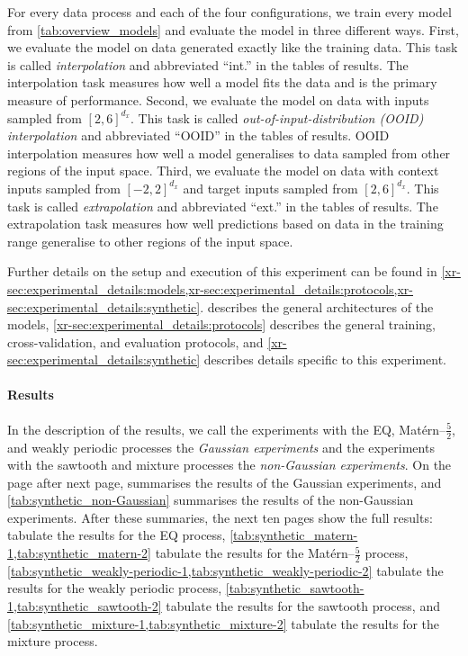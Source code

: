 \documentclass[12pt, twoside]{report}
\newcommand{\xrprefix}[1]{xr-#1}
\begin{document}
For every data process and each of the four configurations, we train every model from \cref{tab:overview_models} and evaluate the model in three different ways.
First, we evaluate the model on data generated exactly like the training data.
This task is called \emph{interpolation} and abbreviated ``int.'' in the tables of results.
The interpolation task measures how well a model fits the data
and is the primary measure of performance.
Second, we evaluate the model on data with inputs sampled from $[2, 6]^{d_x}$.
This task is called \emph{out-of-input-distribution (OOID) interpolation} and abbreviated ``OOID'' in the tables of results.
OOID interpolation measures how well a model generalises to data sampled from other regions of the input space.
Third, we evaluate the model on data with context inputs sampled from $[-2, 2]^{d_x}$ and target inputs sampled from $[2, 6]^{d_x}$.
This task is called \emph{extrapolation} and abbreviated ``ext.'' in the tables of results.
The extrapolation task measures how well predictions based on data in the training range generalise to other regions of the input space.

Further details on the setup and execution of this experiment can be found in
\cref{\xrprefix{sec:experimental_details:models},\xrprefix{sec:experimental_details:protocols},\xrprefix{sec:experimental_details:synthetic}}.
\Cref{\xrprefix{sec:experimental_details:models}} describes the general architectures of the models, \cref{\xrprefix{sec:experimental_details:protocols}} describes the general training, cross-validation, and evaluation protocols, and \cref{\xrprefix{sec:experimental_details:synthetic}} describes details specific to this experiment.

\paragraph{Results}
In the description of the results, we call the experiments with the EQ, Mat\'ern--$\frac52$, and weakly periodic processes the \emph{Gaussian experiments} and the experiments with the sawtooth and mixture processes the \emph{non-Gaussian experiments}.
On the page after next page,
 summarises the results of the Gaussian experiments, and \cref{tab:synthetic_non-Gaussian} summarises the results of the non-Gaussian experiments.
After these summaries, the next ten pages show the full results:
 tabulate the results for the EQ process,
\cref{tab:synthetic_matern-1,tab:synthetic_matern-2} tabulate the results for the Mat\'ern--$\frac52$ process,
\cref{tab:synthetic_weakly-periodic-1,tab:synthetic_weakly-periodic-2} tabulate the results for the weakly periodic process,
\cref{tab:synthetic_sawtooth-1,tab:synthetic_sawtooth-2} tabulate the results for the sawtooth process, and
\cref{tab:synthetic_mixture-1,tab:synthetic_mixture-2} tabulate the results for the mixture process.
\end{document}
